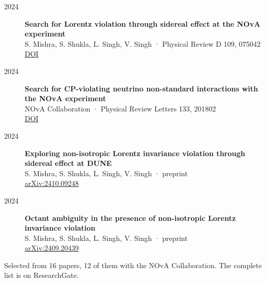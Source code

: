 \begin{description}
\item[2024] \textbf{Search for Lorentz violation through sidereal effect at the NOvA experiment} \\
S. Mishra, S. Shukla, L. Singh, V. Singh · Physical Review D 109, 075042 \\
\href{https://doi.org/10.1103/PhysRevD.109.075042}{DOI}

\item[2024] \textbf{Search for CP-violating neutrino non-standard interactions with the NOvA experiment} \\
NOvA Collaboration · Physical Review Letters 133, 201802 \\
\href{https://doi.org/10.1103/PhysRevLett.133.201802}{DOI}

\item[2024] \textbf{Exploring non-isotropic Lorentz invariance violation through sidereal effect at DUNE} \\
S. Mishra, S. Shukla, L. Singh, V. Singh · preprint \\
\href{https://arxiv.org/abs/2410.09248}{arXiv:2410.09248}

\item[2024] \textbf{Octant ambiguity in the presence of non-isotropic Lorentz invariance violation} \\
S. Mishra, S. Shukla, L. Singh, V. Singh · preprint \\
\href{https://arxiv.org/abs/2409.20439}{arXiv:2409.20439}

\end{description}

Selected from 16 papers, 12 of them with the NOvA Collaboration. The complete list is on ResearchGate.

